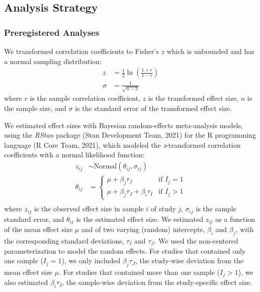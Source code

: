 \documentclass[12pt, letterpaper]{article}
\begin{document}
\hypertarget{analysis-strategy}{%
\subsection{Analysis Strategy}\label{analysis-strategy}}

\hypertarget{preregistered-analyses}{%
\subsubsection{Preregistered Analyses}\label{preregistered-analyses}}

We transformed correlation coefficients to Fisher's \(z\) which is
unbounded and has a normal sampling distribution: \begin{align*} 
z & = \frac{1}{2} \ln\left(\frac{1 + r}{1 - r}\right) \\ \sigma & = \frac{1}{\sqrt{n - 3}} \end{align*}
where \(r\) is the sample correlation coefficient, \(z\) is the
transformed effect size, \(n\) is the sample size, and \(\sigma\) is the
standard error of the transformed effect size.

We estimated effect sizes with Bayesian random-effects meta-analysis
models, using the \emph{RStan} package (Stan Development Team, 2021) for
the R programming language (R Core Team, 2021), which modeled the
\emph{z}-transformed correlation coefficients with a normal likelihood
function:
\begin{align*} z_{ij} &\sim \text{Normal}(\theta_{ij}, \sigma_{ij}) \\ \theta_{ij} &= \begin{cases} \mu + \beta_j\tau_J & \text{if } I_j = 1 \\ \mu + \beta_j\tau_J + \beta_i\tau_I & \text{if } I_j > 1 \end{cases} \\ \end{align*}
where \(z_{ij}\) is the observed effect size in sample \(i\) of study
\(j\), \(\sigma_{ij}\) is the sample standard error, and \(\theta_{ij}\)
is the estimated effect size. We estimated \(z_{ij}\) as a function of
the mean effect size \(\mu\) and of two varying (random) intercepts,
\(\beta_i\) and \(\beta_j\), with the corresponding standard deviations,
\(\tau_I\) and \(\tau_J\). We used the non-centered parameterization to
model the random effects. For studies that contained only one sample
(\(I_j = 1\)), we only included \(\beta_j\tau_J\), the study-wise
deviation from the mean effect size \(\mu\). For studies that contained
more than one sample (\(I_j > 1\)), we also estimated \(\beta_i\tau_I\),
the sample-wise deviation from the study-specific effect size.
\end{document}
